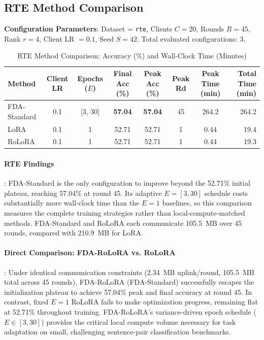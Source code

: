 \documentclass[10pt,a4paper]{article}
\begin{document}
\subsection{RTE Method Comparison}

\textbf{Configuration Parameters}: Dataset = \texttt{rte}, Clients $C = 20$, Rounds $R = 45$, Rank $r = 4$, Client LR $=0.1$, Seed $S = 42$. Total evaluated configurations: 3.

\begin{table}[H]
\centering
\caption{RTE Method Comparison: Accuracy (\%) and Wall-Clock Time (Minutes)}
\label{tab:lr4_e1_rte}
\scriptsize
\setlength{\tabcolsep}{3.5pt}
\begin{tabular*}{\textwidth}{@{\extracolsep{\fill}}lccccccr@{}}
\toprule
\textbf{Method} & \textbf{Client LR} & \textbf{Epochs ($E$)} & \textbf{Final Acc (\%)} & \textbf{Peak Acc (\%)} & \textbf{Peak Rd} & \textbf{Peak Time (min)} & \textbf{Total Time (min)} \\
\midrule
FDA-Standard & 0.1 & [3, 30] & \textbf{57.04} & \textbf{57.04} & 45 & 264.2 & 264.2 \\
LoRA & 0.1 & 1 & 52.71 & 52.71 & 1 & 0.44 & 19.4 \\
RoLoRA & 0.1 & 1 & 52.71 & 52.71 & 1 & 0.44 & 19.3 \\
\bottomrule
\end{tabular*}
\end{table}

\paragraph{RTE Findings}:
FDA-Standard is the only configuration to improve beyond the 52.71\% initial plateau, reaching 57.04\% at round 45.
Its adaptive $E=[3,30]$ schedule costs substantially more wall-clock time than the $E=1$ baselines, so this comparison measures the complete training strategies rather than local-compute-matched methods.
FDA-Standard and RoLoRA each communicate 105.5~MB over 45 rounds, compared with 210.9~MB for LoRA.

\paragraph{Direct Comparison: FDA-RoLoRA vs. RoLoRA}:
Under identical communication constraints (2.34~MB uplink/round, 105.5~MB total across 45 rounds), FDA-RoLoRA (FDA-Standard) successfully escapes the initialization plateau to achieve 57.04\% peak and final accuracy at round 45. In contrast, fixed $E=1$ RoLoRA fails to make optimization progress, remaining flat at 52.71\% throughout training. FDA-RoLoRA's variance-driven epoch schedule ($E \in [3, 30]$) provides the critical local compute volume necessary for task adaptation on small, challenging sentence-pair classification benchmarks.
\end{document}
